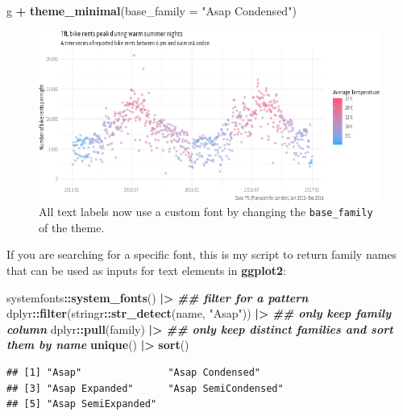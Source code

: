 \documentclass[
]{krantz}
\makeatletter
\newenvironment{Shaded}{\begin{snugshade}}{\end{snugshade}}
\newcommand{\AttributeTok}[1]{\textcolor[rgb]{0.27,0.27,0.27}{#1}}
\newcommand{\DocumentationTok}[1]{\textcolor[rgb]{0.37,0.37,0.37}{\textbf{\textit{#1}}}}
\newcommand{\FunctionTok}[1]{\textcolor[rgb]{0.27,0.27,0.27}{\textbf{#1}}}
\newcommand{\NormalTok}[1]{#1}
\newcommand{\SpecialCharTok}[1]{\textcolor[rgb]{0.43,0.43,0.43}{\textbf{#1}}}
\newcommand{\StringTok}[1]{\textcolor[rgb]{0.5,0.5,0.5}{#1}}
\newenvironment{kframe}{%
\medskip{}
\setlength{\fboxsep}{.8em}
 \def\at@end@of@kframe{}%
 \ifinner\ifhmode%
  \def\at@end@of@kframe{\end{minipage}}%
  \begin{minipage}{\columnwidth}%
 \fi\fi%
 \def\FrameCommand##1{\hskip\@totalleftmargin \hskip-\fboxsep
 \colorbox{shadecolor}{##1}\hskip-\fboxsep
     \hskip-\linewidth \hskip-\@totalleftmargin \hskip\columnwidth}%
 \MakeFramed {\advance\hsize-\width
   \@totalleftmargin\z@ \linewidth\hsize
   \@setminipage}}%
 {\par\unskip\endMakeFramed%
 \at@end@of@kframe}
\renewenvironment{Shaded}{\begin{kframe}}{\end{kframe}}
\makeatother
\begin{document}
\begin{Shaded}
\begin{Highlighting}[]
\NormalTok{g }\SpecialCharTok{+} \FunctionTok{theme\_minimal}\NormalTok{(}\AttributeTok{base\_family =} \StringTok{"Asap Condensed"}\NormalTok{)}
\end{Highlighting}
\end{Shaded}

\begin{figure}
\centering
\includegraphics{bookdown_files/figure-latex/05themeBaseFamily-1.png}
\caption{\label{fig:05themeBaseFamily}All text labels now use a custom font by changing the \texttt{base\_family} of the theme.}
\end{figure}

If you are searching for a specific font, this is my script to return family names that can be used as inputs for text elements in \textbf{ggplot2}:

\begin{Shaded}
\begin{Highlighting}[]
\NormalTok{systemfonts}\SpecialCharTok{::}\FunctionTok{system\_fonts}\NormalTok{() }\SpecialCharTok{|\textgreater{}} 
  \DocumentationTok{\#\# filter for a pattern}
\NormalTok{  dplyr}\SpecialCharTok{::}\FunctionTok{filter}\NormalTok{(stringr}\SpecialCharTok{::}\FunctionTok{str\_detect}\NormalTok{(name, }\StringTok{"Asap"}\NormalTok{)) }\SpecialCharTok{|\textgreater{}} 
  \DocumentationTok{\#\# only keep family column}
\NormalTok{  dplyr}\SpecialCharTok{::}\FunctionTok{pull}\NormalTok{(family) }\SpecialCharTok{|\textgreater{}} 
  \DocumentationTok{\#\# only keep distinct families and sort them by name}
  \FunctionTok{unique}\NormalTok{() }\SpecialCharTok{|\textgreater{}} 
  \FunctionTok{sort}\NormalTok{()}
\end{Highlighting}
\end{Shaded}

\begin{verbatim}
## [1] "Asap"               "Asap Condensed"    
## [3] "Asap Expanded"      "Asap SemiCondensed"
## [5] "Asap SemiExpanded"
\end{verbatim}
\end{document}
